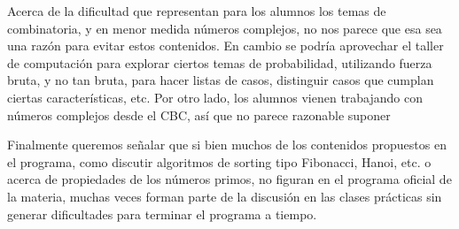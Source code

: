 \documentclass[11pt,fleqn]{article}
\begin{document}
Acerca de la dificultad que representan para los alumnos los temas de combinatoria, y en
menor medida números complejos, no nos parece que esa sea una razón para evitar estos
contenidos. En cambio se podría aprovechar el taller de computación para explorar ciertos
temas de probabilidad, utilizando fuerza bruta, y no tan bruta, para hacer listas de
casos, distinguir casos que cumplan ciertas características, etc. Por otro lado, los
alumnos vienen trabajando con números complejos desde el CBC, así que no parece razonable
suponer

Finalmente queremos señalar que si bien muchos de los contenidos propuestos en el
programa, como discutir algoritmos de sorting tipo Fibonacci, Hanoi, etc. o acerca de
propiedades de los números primos, no figuran en el programa oficial de la materia, muchas
veces forman parte de la discusión en las clases prácticas sin generar dificultades para
terminar el programa a tiempo.
\end{document}
